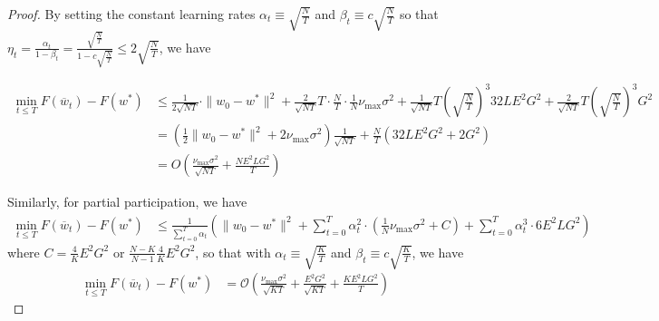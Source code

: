 \begin{proof}
	By setting the constant learning rates $\alpha_{t}\equiv\sqrt{\frac{N}{T}}$
	and $\beta_{t}\equiv c\sqrt{\frac{N}{T}}$ so that $\eta_{t}=\frac{\alpha_{t}}{1-\beta_{t}}=\frac{\sqrt{\frac{N}{T}}}{1-c\sqrt{\frac{N}{T}}}\leq2\sqrt{\frac{N}{T}}$,
	we have 
	
	\begin{align*}
	\min_{t\leq T}F(\overline{w}_{t})-F(w^{\ast}) & \leq\frac{1}{2\sqrt{NT}}\cdot\|w_{0}-w^{\ast}\|^{2}+\frac{2}{\sqrt{NT}}T\cdot\frac{N}{T}\cdot\frac{1}{N}\nu_{\max}\sigma^{2}+\frac{1}{\sqrt{NT}}T(\sqrt{\frac{N}{T}})^{3}32LE^{2}G^{2}+\frac{2}{\sqrt{NT}}T(\sqrt{\frac{N}{T}})^{3}G^{2}\\
	& =(\frac{1}{2}\|w_{0}-w^{\ast}\|^{2}+2\nu_{\max}\sigma^{2})\frac{1}{\sqrt{NT}}+\frac{N}{T}(32LE^{2}G^{2}+2G^{2})\\
	& =O(\frac{\nu_{\max}\sigma^{2}}{\sqrt{NT}}+\frac{NE^{2}LG^{2}}{T})
	\end{align*}
	
	Similarly, for partial participation, we have 
	\begin{align*}
	\min_{t\leq T}F(\overline{w}_{t})-F(w^{\ast}) & \leq\frac{1}{\sum_{t=0}^{T}\alpha_{t}}\left(\|w_{0}-w^{\ast}\|^{2}+\sum_{t=0}^{T}\alpha_{t}^{2}\cdot(\frac{1}{N}\nu_{\max}\sigma^{2}+C)+\sum_{t=0}^{T}\alpha_{t}^{3}\cdot6E^{2}LG^{2}\right)
	\end{align*}
	where $C=\frac{4}{K}E^{2}G^{2}$ or $\frac{N-K}{N-1}\frac{4}{K}E^{2}G^{2}$,
	so that with $\alpha_{t}\equiv\sqrt{\frac{K}{T}}$ and $\beta_{t}\equiv c\sqrt{\frac{K}{T}}$,
	we have 
	\begin{align*}
	\min_{t\leq T}F(\overline{w}_{t})-F(w^{\ast}) & =\mathcal{O}(\frac{\nu_{\max}\sigma^{2}}{\sqrt{KT}}+\frac{E^{2}G^{2}}{\sqrt{KT}}+\frac{KE^{2}LG^{2}}{T})
	\end{align*}
\end{proof}